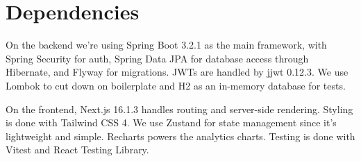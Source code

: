 \documentclass[a4paper,11pt]{article}
\begin{document}
\section{Dependencies}

On the backend we're using Spring Boot 3.2.1 as the main framework, with Spring Security for auth, Spring Data JPA for database access through Hibernate, and Flyway for migrations. JWTs are handled by jjwt 0.12.3. We use Lombok to cut down on boilerplate and H2 as an in-memory database for tests.

On the frontend, Next.js 16.1.3 handles routing and server-side rendering. Styling is done with Tailwind CSS 4. We use Zustand for state management since it's lightweight and simple. Recharts powers the analytics charts. Testing is done with Vitest and React Testing Library.
\end{document}
